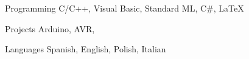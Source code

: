 

\begin{cvskills}


  \cvskill
    {Programming} %
    {C/C++, Visual Basic, Standard ML, C\#, LaTeX} %

  \cvskill
    {Projects} %
    {Arduino, AVR, } %

  \cvskill
    {Languages} %
    {Spanish, English, Polish, Italian} %

\end{cvskills}
